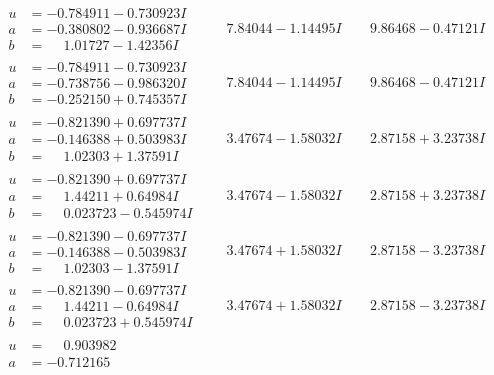 \documentclass[1p]{elsarticle_modified}
\theoremstyle{definition}
\begin{document}
$$\begin{array}{c|c|c}
 \hline 
\begin{aligned}
u &= -0.784911 - 0.730923 I \\
a &= -0.380802 - 0.936687 I \\
b &= \phantom{-}1.01727 - 1.42356 I\end{aligned}
 & \phantom{-}7.84044 - 1.14495 I & \phantom{-}9.86468 - 0.47121 I \\ \hline\begin{aligned}
u &= -0.784911 - 0.730923 I \\
a &= -0.738756 - 0.986320 I \\
b &= -0.252150 + 0.745357 I\end{aligned}
 & \phantom{-}7.84044 - 1.14495 I & \phantom{-}9.86468 - 0.47121 I \\ \hline\begin{aligned}
u &= -0.821390 + 0.697737 I \\
a &= -0.146388 + 0.503983 I \\
b &= \phantom{-}1.02303 + 1.37591 I\end{aligned}
 & \phantom{-}3.47674 - 1.58032 I & \phantom{-}2.87158 + 3.23738 I \\ \hline\begin{aligned}
u &= -0.821390 + 0.697737 I \\
a &= \phantom{-}1.44211 + 0.64984 I \\
b &= \phantom{-}0.023723 - 0.545974 I\end{aligned}
 & \phantom{-}3.47674 - 1.58032 I & \phantom{-}2.87158 + 3.23738 I \\ \hline\begin{aligned}
u &= -0.821390 - 0.697737 I \\
a &= -0.146388 - 0.503983 I \\
b &= \phantom{-}1.02303 - 1.37591 I\end{aligned}
 & \phantom{-}3.47674 + 1.58032 I & \phantom{-}2.87158 - 3.23738 I \\ \hline\begin{aligned}
u &= -0.821390 - 0.697737 I \\
a &= \phantom{-}1.44211 - 0.64984 I \\
b &= \phantom{-}0.023723 + 0.545974 I\end{aligned}
 & \phantom{-}3.47674 + 1.58032 I & \phantom{-}2.87158 - 3.23738 I \\ \hline\begin{aligned}
u &= \phantom{-}0.903982\phantom{ +0.000000I} \\
a &= -0.712165\phantom{ +0.000000I} \\

\end{aligned}
\end{array}$$
\end{document}

